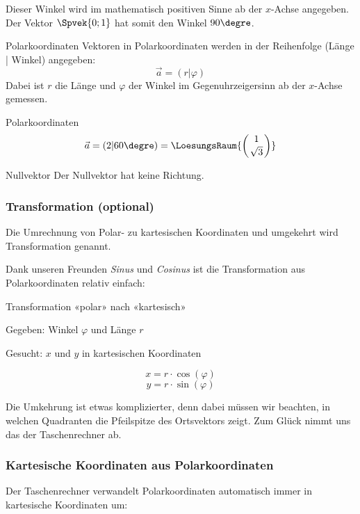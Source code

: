 Dieser Winkel wird im mathematisch positiven Sinne ab der $x$-Achse
angegeben. Der Vektor
$\Spvek{0;1}$ hat somit den Winkel $90\degre$.
  \begin{definition}{Polarkoordinaten}{}
    Vektoren in Polarkoordinaten werden in der Reihenfolge (Länge |
    Winkel) angegeben:
    $$\vec{a} = (r | \varphi)$$
    Dabei ist $r$ die Länge und $\varphi$ der Winkel im
    Gegenuhrzeigersinn ab der $x$-Achse gemessen.
  \end{definition}

  \begin{beispiel}{Polarkoordinaten}{}
    $$\vec{a} = (2 | 60\degre) = \LoesungsRaum{\left(1\atop \sqrt{3}\right)}$$
  \end{beispiel}
  
  \begin{bemerkung}{Nullvektor}{}
    Der Nullvektor hat keine Richtung.
    \end{bemerkung}
  \newpage
  
\subsubsection{Transformation (optional)}
  Die Umrechnung von Polar- zu kartesischen
  Koordinaten und umgekehrt wird Transformation genannt.
  
  Dank unseren Freunden \textit{Sinus} und \textit{Cosinus} ist die
  Transformation aus Polarkoordinaten relativ einfach:
  \begin{rezept}{Transformation «polar» nach «kartesisch»}{}

    Gegeben:  Winkel $\varphi$ und Länge $r$

    Gesucht: $x$ und $y$ in kartesischen Koordinaten

    $$x = r\cdot{}\cos(\varphi)$$
    $$y = r\cdot{}\sin(\varphi)$$
  \end{rezept}

  Die Umkehrung ist etwas komplizierter, denn dabei müssen wir
  beachten, in welchen Quadranten die Pfeilspitze des Ortsvektors
  zeigt.
  Zum Glück nimmt uns das der Taschenrechner ab.

  \subsubsection{Kartesische Koordinaten aus Polarkoordinaten}
  Der Taschenrechner verwandelt Polarkoordinaten automatisch immer in
  kartesische Koordinaten um:

